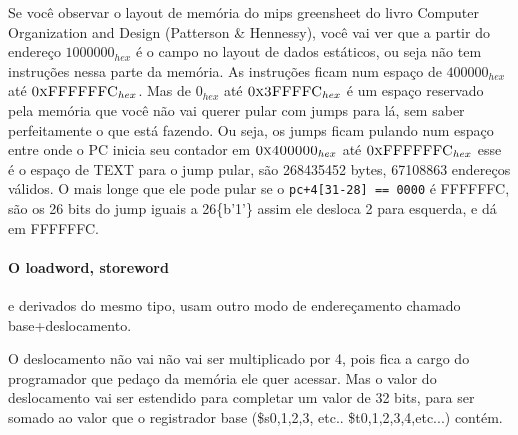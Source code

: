 \documentclass{article}
\begin{document}
\begin{table}[ht!]
\end{table}

Se você observar o layout de memória do mips greensheet do livro Computer
Organization and Design (Patterson \& Hennessy), você vai ver que a partir do
endereço $1000000_{hex}$ é o campo no layout de dados estáticos, ou seja não tem
instruções nessa parte da memória. As instruções ficam num espaço de
$400000_{hex}$ até $\textsc{0xFFFFFFC}_{hex}$. Mas de $0_{hex}$ até
$\textsc{0x3FFFFC}_{hex}$ é um espaço reservado pela memória que você não vai
querer pular com jumps para lá, sem saber perfeitamente o que está fazendo. Ou
seja, os jumps ficam pulando num espaço entre onde o PC inicia seu contador em
$\textsc{0x400000}_{hex}$ até $\textsc{0xFFFFFFC}_{hex}$ esse é o espaço de
\textsc{TEXT} para o jump pular, são 268435452 bytes, 67108863 endereços
válidos. O mais longe que ele pode pular se o \verb|pc+4[31-28] == 0000| é
FFFFFFC, são os 26 bits do jump iguais a 26\{b'1'\} assim ele desloca 2 para
esquerda, e dá em FFFFFFC.

\pagebreak
\paragraph{O loadword, storeword} e derivados do mesmo tipo, usam outro modo de
endereçamento chamado base+deslocamento.

O deslocamento não vai não vai ser multiplicado por 4, pois fica a cargo do
programador que pedaço da memória ele quer acessar. Mas o valor do deslocamento
vai ser estendido para completar um valor de 32 bits, para ser somado ao valor
que o registrador base (\$s0,1,2,3, etc.. \$t0,1,2,3,4,etc...) contém.
\end{document}
